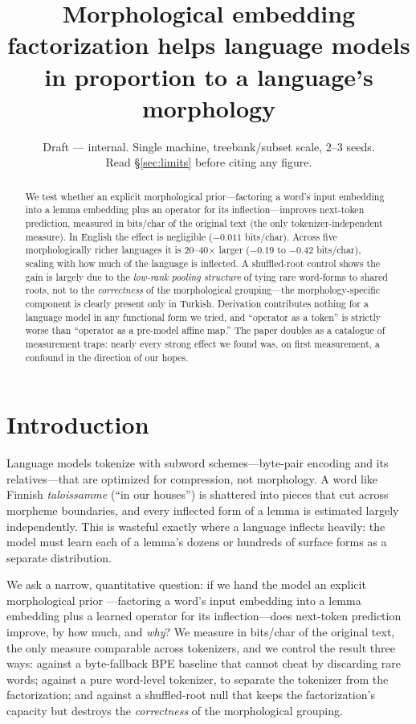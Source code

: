\documentclass[11pt]{article}
\title{\bfseries Morphological embedding factorization helps language models\\
in proportion to a language's morphology}
\author{}
\date{Draft --- internal. Single machine, treebank/subset scale, 2--3 seeds.\\
Read \S\ref{sec:limits} before citing any figure.}
\newcommand{\bc}{bits/char}
\begin{document}
\maketitle

\begin{abstract}
\noindent
We test whether an explicit morphological prior---factoring a word's input embedding into
a lemma embedding plus an operator for its inflection---improves next-token prediction,
measured in \bc{} of the original text (the only tokenizer-independent measure). In English
the effect is negligible ($-0.011$ \bc). Across five morphologically richer languages it is
20--40$\times$ larger ($-0.19$ to $-0.42$ \bc), scaling with how much of the language is
inflected. A shuffled-root control shows the gain is largely due to the \emph{low-rank
pooling structure} of tying rare word-forms to shared roots, not to the \emph{correctness}
of the morphological grouping---the morphology-specific component is clearly present only in
Turkish. Derivation contributes nothing for a language model in any functional form we
tried, and ``operator as a token'' is strictly worse than ``operator as a pre-model affine
map.'' The paper doubles as a catalogue of measurement traps: nearly every strong effect we
found was, on first measurement, a confound in the direction of our hopes.
\end{abstract}

\section{Introduction}
Language models tokenize with subword schemes---byte-pair encoding and its relatives---that
are optimized for compression, not morphology. A word like Finnish \textit{taloissamme}
(``in our houses'') is shattered into pieces that cut across morpheme boundaries, and every
inflected form of a lemma is estimated largely independently. This is wasteful exactly where
a language inflects heavily: the model must learn each of a lemma's dozens or hundreds of
surface forms as a separate distribution.

We ask a narrow, quantitative question: if we hand the model an explicit morphological prior
---factoring a word's input embedding into a lemma embedding plus a learned operator for its
inflection---does next-token prediction improve, by how much, and \emph{why}? We measure in
\bc{} of the original text, the only measure comparable across tokenizers, and we control the
result three ways: against a byte-fallback BPE baseline that cannot cheat by discarding rare
words; against a pure word-level tokenizer, to separate the tokenizer from the factorization;
and against a shuffled-root null that keeps the factorization's capacity but destroys the
\emph{correctness} of the morphological grouping.
\end{document}
